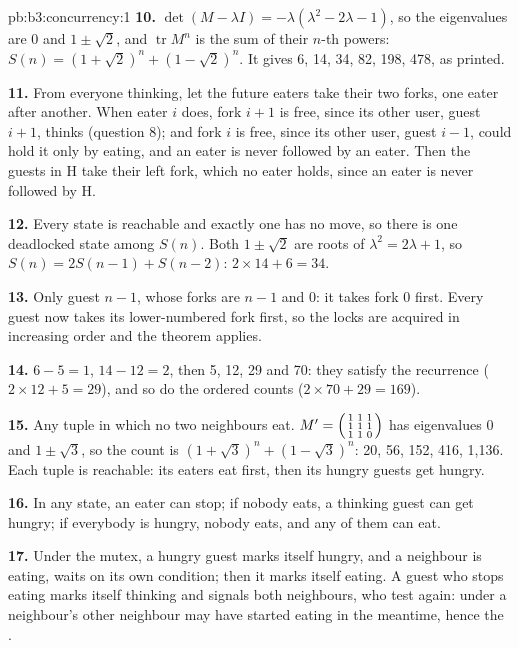 \begin{solution}{pb:b3:concurrency:1}
\textbf{10.} $\det(M - \lambda I) = -\lambda(\lambda^2 - 2\lambda - 1)$, so the eigenvalues are 0 and $1 \pm \sqrt{2}$, and $\operatorname{tr} M^n$ is the sum of their $n$-th powers: $S(n) = (1 + \sqrt{2})^n + (1 - \sqrt{2})^n$. It gives 6, 14, 34, 82, 198, 478, as printed.

\textbf{11.} From everyone thinking, let the future eaters take their two forks, one eater after another. When eater $i$ does, fork $i + 1$ is free, since its other user, guest $i + 1$, thinks (question 8); and fork $i$ is free, since its other user, guest $i - 1$, could hold it only by eating, and an eater is never followed by an eater. Then the guests in H take their left fork, which no eater holds, since an eater is never followed by H.

\textbf{12.} Every state is reachable and exactly one has no move, so there is one deadlocked state among $S(n)$. Both $1 \pm \sqrt{2}$ are roots of $\lambda^2 = 2\lambda + 1$, so $S(n) = 2S(n - 1) + S(n - 2)$: $2 \times 14 + 6 = 34$.

\textbf{13.} Only guest $n - 1$, whose forks are $n - 1$ and $0$: it takes fork 0 first. Every guest now takes its lower-numbered fork first, so the locks are acquired in increasing order and the theorem applies.

\textbf{14.} $6 - 5 = 1$, $14 - 12 = 2$, then 5, 12, 29 and 70: they satisfy the recurrence ($2 \times 12 + 5 = 29$), and so do the ordered counts ($2 \times 70 + 29 = 169$).

\textbf{15.} Any tuple in which no two neighbours eat. $M' = \begin{psmallmatrix} 1 & 1 & 1 \\ 1 & 1 & 1 \\ 1 & 1 & 0 \end{psmallmatrix}$ has eigenvalues 0 and $1 \pm \sqrt{3}$, so the count is $(1 + \sqrt{3})^n + (1 - \sqrt{3})^n$: 20, 56, 152, 416, 1,136. Each tuple is reachable: its eaters eat first, then its hungry guests get hungry.

\textbf{16.} In any state, an eater can stop; if nobody eats, a thinking guest can get hungry; if everybody is hungry, nobody eats, and any of them can eat.

\textbf{17.} Under the mutex, a hungry guest marks itself hungry, and  a neighbour is eating, waits on its own condition; then it marks itself eating. A guest who stops eating marks itself thinking and signals both neighbours, who test again: under  a neighbour's other neighbour may have started eating in the meantime, hence the .


\end{solution}
